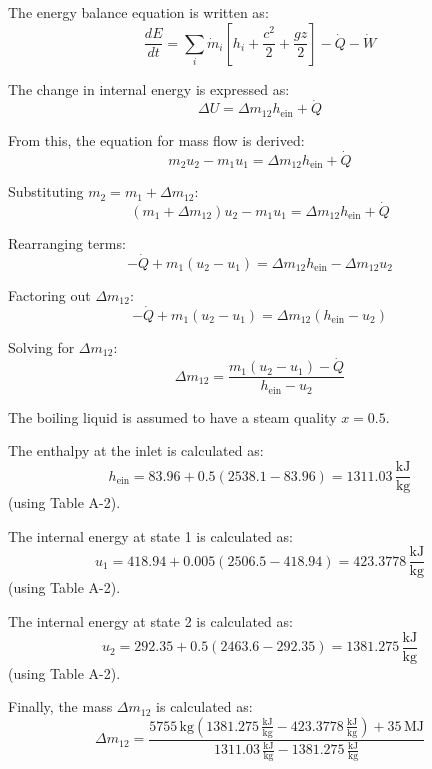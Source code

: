 The energy balance equation is written as:  
\[
\frac{dE}{dt} = \sum_i \dot{m}_i \left[ h_i + \frac{c^2}{2} + \frac{g z}{2} \right] - \dot{Q} - \dot{W}
\]

The change in internal energy is expressed as:  
\[
\Delta U = \Delta m_{12} h_{\text{ein}} + \dot{Q}
\]

From this, the equation for mass flow is derived:  
\[
m_2 u_2 - m_1 u_1 = \Delta m_{12} h_{\text{ein}} + \dot{Q}
\]

Substituting \( m_2 = m_1 + \Delta m_{12} \):  
\[
(m_1 + \Delta m_{12}) u_2 - m_1 u_1 = \Delta m_{12} h_{\text{ein}} + \dot{Q}
\]

Rearranging terms:  
\[
-\dot{Q} + m_1 (u_2 - u_1) = \Delta m_{12} h_{\text{ein}} - \Delta m_{12} u_2
\]

Factoring out \( \Delta m_{12} \):  
\[
-\dot{Q} + m_1 (u_2 - u_1) = \Delta m_{12} (h_{\text{ein}} - u_2)
\]

Solving for \( \Delta m_{12} \):  
\[
\Delta m_{12} = \frac{m_1 (u_2 - u_1) - \dot{Q}}{h_{\text{ein}} - u_2}
\]

The boiling liquid is assumed to have a steam quality \( x = 0.5 \).  

The enthalpy at the inlet is calculated as:  
\[
h_{\text{ein}} = 83.96 + 0.5 (2538.1 - 83.96) = 1311.03 \, \frac{\text{kJ}}{\text{kg}}
\]
(using Table A-2).  

The internal energy at state 1 is calculated as:  
\[
u_1 = 418.94 + 0.005 (2506.5 - 418.94) = 423.3778 \, \frac{\text{kJ}}{\text{kg}}
\]
(using Table A-2).  

The internal energy at state 2 is calculated as:  
\[
u_2 = 292.35 + 0.5 (2463.6 - 292.35) = 1381.275 \, \frac{\text{kJ}}{\text{kg}}
\]
(using Table A-2).  

Finally, the mass \( \Delta m_{12} \) is calculated as:  
\[
\Delta m_{12} = \frac{5755 \, \text{kg} (1381.275 \, \frac{\text{kJ}}{\text{kg}} - 423.3778 \, \frac{\text{kJ}}{\text{kg}}) + 35 \, \text{MJ}}{1311.03 \, \frac{\text{kJ}}{\text{kg}} - 1381.275 \, \frac{\text{kJ}}{\text{kg}}}
\]